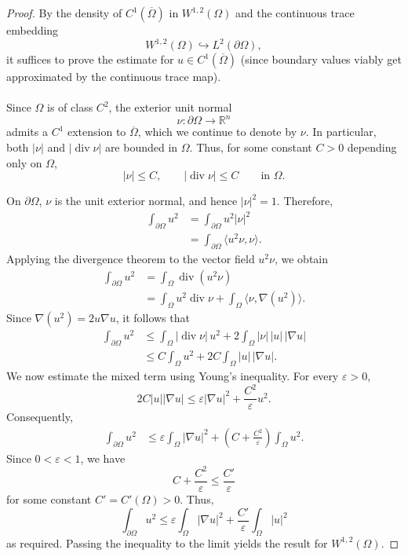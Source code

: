 \begin{proof}
By the density of $C^1(\overline{\Omega})$ in $W^{1,2}(\Omega)$ and
the continuous trace embedding
\[
    W^{1,2}(\Omega)\hookrightarrow L^2(\partial\Omega),
\]
it suffices to prove the estimate for
$u\in C^1(\overline{\Omega})$ (since boundary values viably get approximated by the continuous trace map).
\\\\ Since $\Omega$ is of class $C^2$, the exterior unit normal
\[
    \nu:\partial\Omega\to\mathbb{R}^n
\]
admits a $C^1$ extension to $\overline{\Omega}$, which we continue
to denote by $\nu$. In particular, both $|\nu|$ and
$|\operatorname{div}\nu|$ are bounded in $\Omega$. Thus, for some
constant $C>0$ depending only on $\Omega$,
\[
    |\nu|\leq C,
    \qquad
    |\operatorname{div}\nu|\leq C
    \qquad\text{in }\Omega.
\]

On $\partial\Omega$, $\nu$ is the unit exterior normal, and hence
$|\nu|^2=1$. Therefore,
\[
\begin{aligned}
    \int_{\partial\Omega}u^2
    &=
    \int_{\partial\Omega}u^2|\nu|^2\\
    &=
    \int_{\partial\Omega}\langle u^2\nu,\nu\rangle.
\end{aligned}
\]
Applying the divergence theorem to the vector field $u^2\nu$, we
obtain
\[
\begin{aligned}
    \int_{\partial\Omega}u^2
    &=
    \int_\Omega\operatorname{div}(u^2\nu)\\
    &=
    \int_\Omega u^2\operatorname{div}\nu
    +
    \int_\Omega\langle\nu,\nabla(u^2)\rangle.
\end{aligned}
\]
Since $\nabla(u^2)=2u\nabla u$, it follows that
\[
\begin{aligned}
    \int_{\partial\Omega}u^2
    &\leq
    \int_\Omega|\operatorname{div}\nu|\,u^2
    +
    2\int_\Omega|\nu|\,|u|\,|\nabla u|\\
    &\leq
    C\int_\Omega u^2
    +
    2C\int_\Omega|u|\,|\nabla u|.
\end{aligned}
\]
We now estimate the mixed term using Young's inequality. For every
$\varepsilon>0$,
\[
    2C|u||\nabla u|
    \leq
    \varepsilon|\nabla u|^2
    +
    \frac{C^2}{\varepsilon}u^2.
\]
Consequently,
\[
\begin{aligned}
    \int_{\partial\Omega}u^2
    &\leq
    \varepsilon\int_\Omega|\nabla u|^2
    +
    \left(
        C+\frac{C^2}{\varepsilon}
    \right)
    \int_\Omega u^2.
\end{aligned}
\]
Since $0<\varepsilon<1$, we have
\[
    C+\frac{C^2}{\varepsilon}
    \leq
    \frac{C'}{\varepsilon}
\]
for some constant $C'=C'(\Omega)>0$. Thus,
\[
    \boxed{
    \int_{\partial\Omega}u^2
    \leq
    \varepsilon\int_\Omega|\nabla u|^2
    +
    \frac{C'}{\varepsilon}\int_\Omega|u|^2
    }
\]
as required. Passing the inequality to the limit yields the result for $W^{1,2}(\Omega)$.
\end{proof}
